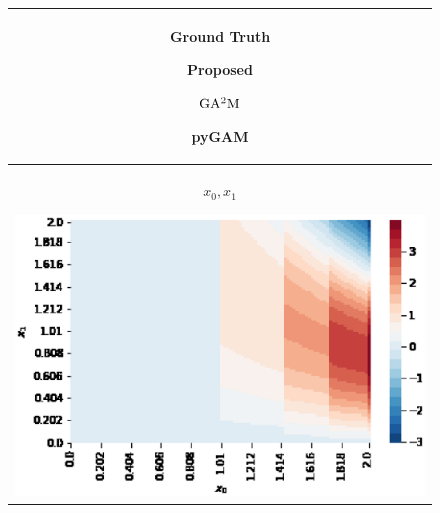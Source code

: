 \begin{figure}[h]
    \centering
    \begin{tabular}{c}
        \begin{minipage}{0.04\hsize}
            \centering
        \end{minipage}
        \begin{minipage}{0.24\hsize}
            \centering
            Ground Truth
        \end{minipage}
        \begin{minipage}{0.24\hsize}
            \centering
            Proposed
        \end{minipage}
        \begin{minipage}{0.24\hsize}
            \centering
            $\rm GA^2M$
        \end{minipage}
        \begin{minipage}{0.24\hsize}
            \centering
            pyGAM
        \end{minipage}
        \\ \hline
        \begin{minipage}{0.04\hsize}
            \small
            $x_0, x_1$
        \end{minipage}
        \begin{minipage}{0.24\hsize}
            \centering
            \includegraphics[width=0.95\hsize]{Matsushima/heatmaps/ideal-01.eps}
        \end{minipage}
        \begin{minipage}{0.24\hsize}
            \centering

\end{minipage}
\end{tabular}
\end{figure}

